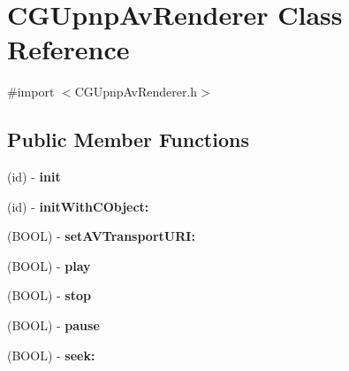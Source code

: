 \hypertarget{interface_c_g_upnp_av_renderer}{\section{C\-G\-Upnp\-Av\-Renderer Class Reference}
\label{interface_c_g_upnp_av_renderer}
}


{\ttfamily \#import $<$C\-G\-Upnp\-Av\-Renderer.\-h$>$}

\subsection*{Public Member Functions}
\begin{DoxyCompactItemize}
\item 
\hypertarget{interface_c_g_upnp_av_renderer_a14217add4c371ccc09599df33c79f6ec}{(id) -\/ {\bfseries init}}\label{interface_c_g_upnp_av_renderer_a14217add4c371ccc09599df33c79f6ec}

\item 
\hypertarget{interface_c_g_upnp_av_renderer_a2b6b5412a760d7504b9ab73acaab029d}{(id) -\/ {\bfseries init\-With\-C\-Object\-:}}\label{interface_c_g_upnp_av_renderer_a2b6b5412a760d7504b9ab73acaab029d}

\item 
\hypertarget{interface_c_g_upnp_av_renderer_a0eab9ab41539d9b001060722b94fe7c8}{(B\-O\-O\-L) -\/ {\bfseries set\-A\-V\-Transport\-U\-R\-I\-:}}\label{interface_c_g_upnp_av_renderer_a0eab9ab41539d9b001060722b94fe7c8}

\item 
\hypertarget{interface_c_g_upnp_av_renderer_a14dc5ec18273af1619a217d4caa2cbb6}{(B\-O\-O\-L) -\/ {\bfseries play}}\label{interface_c_g_upnp_av_renderer_a14dc5ec18273af1619a217d4caa2cbb6}

\item 
\hypertarget{interface_c_g_upnp_av_renderer_a67fd25fea96cdf69a19855c47d32b335}{(B\-O\-O\-L) -\/ {\bfseries stop}}\label{interface_c_g_upnp_av_renderer_a67fd25fea96cdf69a19855c47d32b335}

\item 
\hypertarget{interface_c_g_upnp_av_renderer_a96a45d0696d6c162af083faefee003df}{(B\-O\-O\-L) -\/ {\bfseries pause}}\label{interface_c_g_upnp_av_renderer_a96a45d0696d6c162af083faefee003df}

\item 
\hypertarget{interface_c_g_upnp_av_renderer_a65a774fb0c6fd9770a2c1d37a309ab41}{(B\-O\-O\-L) -\/ {\bfseries seek\-:}}\label{interface_c_g_upnp_av_renderer_a65a774fb0c6fd9770a2c1d37a309ab41}


\end{DoxyCompactItemize}
